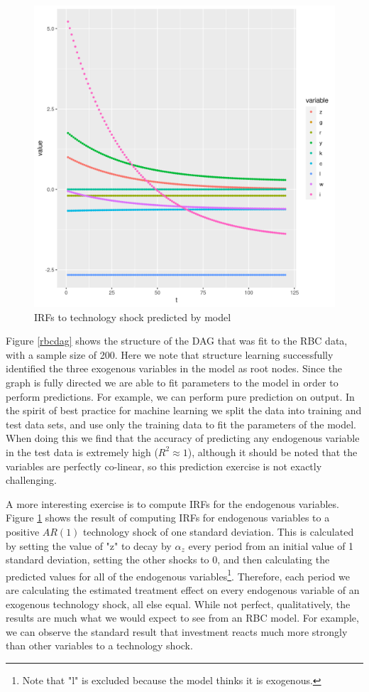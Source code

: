 \documentclass{article}
\begin{document}
\begin{figure}
  \centering
  \includegraphics[width=\textwidth, height=0.4\textheight, keepaspectratio]{images/rbc_irf.png}
  \caption{IRFs to technology shock predicted by model}
  \label{rbcirf}
\end{figure}

Figure \ref{rbcdag} shows the structure of the DAG that was fit to the RBC data, with a sample size of 200. Here we note that structure learning successfully identified the three exogenous variables in the model as root nodes. Since the graph is fully directed we are able to fit parameters to the model in order to perform predictions. For example, we can perform pure prediction on output. In the spirit of best practice for machine learning we split the data into training and test data sets, and use only the training data to fit the parameters of the model. When doing this we find that the accuracy of predicting any endogenous variable in the test data is extremely high ($R^2 \approx 1$), although it should be noted that the variables are perfectly co-linear, so this prediction exercise is not exactly challenging. 

A more interesting exercise is to compute IRFs for the endogenous variables. Figure \ref{rbcirf} shows the result of computing IRFs for endogenous variables to a positive $AR(1)$ technology shock of one standard deviation. This is calculated by setting the value of "z" to decay by $\alpha_z$ every period from an initial value of 1 standard deviation, setting the other shocks to 0, and then calculating the predicted values for all of the endogenous variables\footnote{Note that "l" is excluded because the model thinks it is exogenous.}. Therefore, each period we are calculating the estimated treatment effect on every endogenous variable of an exogenous technology shock, all else equal. While not perfect, qualitatively, the results are much what we would expect to see from an RBC model. For example, we can observe the standard result that investment reacts much more strongly than other variables to a technology shock.
\end{document}
